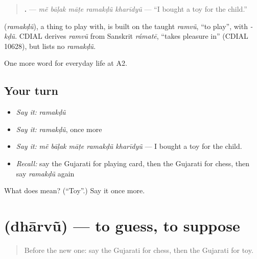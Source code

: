\begin{quote}
\textbf{    .} — \emph{mẽ bāḷak māṭe ramakḍũ kharīdyũ} — \textquotedblleft{}I bought a toy for the child.\textquotedblright{}
\end{quote}

\begin{cousinweb}
\textbf{} (\emph{ramakḍũ}), a thing to play with, is built on the taught \emph{ramvũ}, \textquotedblleft{}to play\textquotedblright{}, with \emph{-kḍũ}. CDIAL derives \emph{ramvũ} from Sanskrit \emph{rámatē}, \textquotedblleft{}takes pleasure in\textquotedblright{} (CDIAL 10628), but lists no \emph{ramakḍũ}.
\end{cousinweb}

\begin{grammarlens}[title={What you've built}]
One more word for everyday life at A2.
\end{grammarlens}

\subsection*{Your turn}
\begin{itemize}
\raggedright
  \item \emph{Say it:} \emph{ramakḍũ}
  \item \emph{Say it:} \emph{ramakḍũ}, once more
  \item \emph{Say it:} \emph{mẽ bāḷak māṭe ramakḍũ kharīdyũ} — I bought a toy for the child.
  \item \emph{Recall:} say the Gujarati for playing card, then the Gujarati for chess, then say \emph{ramakḍũ} again
\end{itemize}

\begin{tcolorbox}[breakable,colback=teal!4,colframe=teal!35!black,title={Before you move on}]
What does  mean? (\textquotedblleft{}Toy\textquotedblright{}.) Say it once more.
\end{tcolorbox}
\section[\texorpdfstring{\gu{ધારવું} (dhārvũ)}{ધારવું (dhārvũ)}]{ (dhārvũ) — to guess, to suppose}

\label{lesson:GU-C260-dharvu}



\begin{quote}
Before the new one: say the Gujarati for chess, then the Gujarati for toy.
\end{quote}


